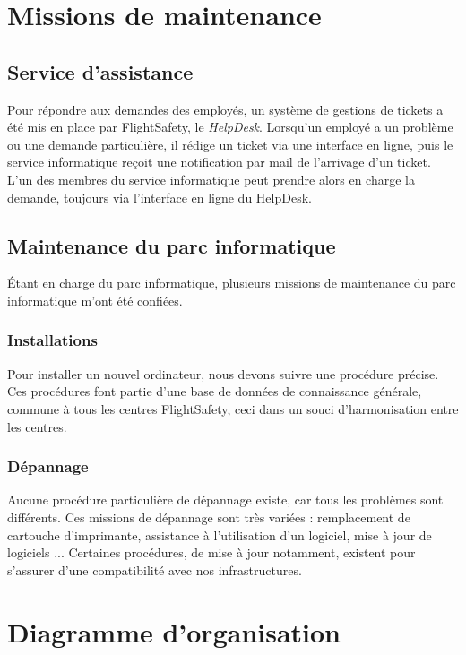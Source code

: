 \documentclass[a4paper,french,11pt,openany,oneside]{memoir}
\begin{document}
\chapter{Missions de maintenance}

\section{Service d'assistance}

Pour répondre aux demandes des employés, un système de gestions de tickets a été mis en place par FlightSafety, le \emph{HelpDesk}. Lorsqu'un employé a un problème ou une demande particulière, il rédige un ticket via une interface en ligne, puis le service informatique reçoit une notification par mail de l'arrivage d'un ticket. L'un des membres du service informatique peut prendre alors en charge la demande, toujours via l'interface en ligne du HelpDesk.

\section{Maintenance du parc informatique}

Étant en charge du parc informatique, plusieurs missions de maintenance du parc informatique m'ont été confiées.

\subsection{Installations}

Pour installer un nouvel ordinateur, nous devons suivre une procédure précise. Ces procédures font partie d'une base de données de connaissance générale, commune à tous les centres FlightSafety, ceci dans un souci d'harmonisation entre les centres.

\subsection{Dépannage}

Aucune procédure particulière de dépannage existe, car tous les problèmes sont différents. Ces missions de dépannage sont très variées : remplacement de cartouche d'imprimante, assistance à l'utilisation d'un logiciel, mise à jour de logiciels ... Certaines procédures, de mise à jour notamment, existent pour s'assurer d'une compatibilité avec nos infrastructures.

\appendix

\chapter{Diagramme d'organisation}
\end{document}
